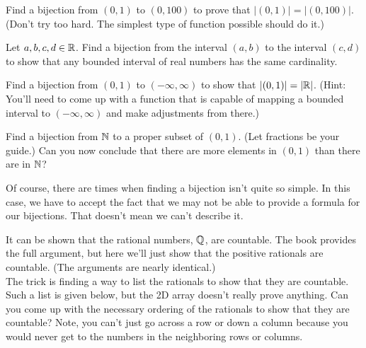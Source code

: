 \begin{question}[resume]
\item Find a bijection from $(0,1)$ to $(0,100)$ to prove that $|(0,1)|=|(0,100)|$.  (Don't try too hard.  The simplest type of function possible should do it.)

\newpage
\item Let $a,b,c,d\in \mathbb{R}$.  Find a bijection from the interval $(a,b)$ to the interval $(c,d)$ to show that any bounded interval of real numbers has the same cardinality.

\vspace{2in}
\item Find a bijection from $(0,1)$ to $(-\infty,\infty)$ to show that $|(0,1)|=|\mathbb{R}|$.  (Hint:  You'll need to come up with a function that is capable of mapping a bounded interval to $(-\infty,\infty)$ and make adjustments from there.)

\newpage
\item Find a bijection from $\mathbb{N}$ to a proper subset of $(0,1)$.  (Let fractions be your guide.)  Can you now conclude that there are more elements in $(0,1)$ than there are in $\mathbb{N}$?

\vspace{3in}
\end{question}

Of course, there are times when finding a bijection isn't quite so simple.  In this case, we have to accept the fact that we may not be able to provide a formula for our bijections.  That doesn't mean we can't describe it.

\begin{question}[resume]
\item It can be shown that the rational numbers, $\mathbb{Q}$, are countable.  The book provides the full argument, but here we'll just show that the positive rationals are countable.  (The arguments are nearly identical.)\\

The trick is finding a way to list the rationals to show that they are countable.  Such a list is given below, but the 2D array doesn't really prove anything.  Can you come up with the necessary ordering of the rationals to show that they are countable?  Note, you can't just go across a row or down a column because you would never get to the numbers in the neighboring rows or columns.
\begin{center}
\end{center}
\end{question}

